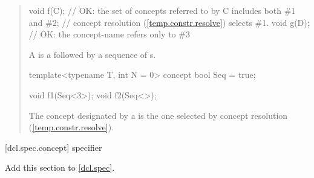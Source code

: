 \begin{quote}
\begin{codeblock}
void f(C); // OK: the set of concepts referred to by C includes both \#1 and \#2;
           // concept resolution (\ref{temp.constr.resolve}) selects \#1.
void g(D); // OK: the concept-name  refers only to \#3
\end{codeblock}
\exitexample

\pnum
A  is a  followed 
by a sequence of s.
%
\enterexample
\begin{codeblock}
template<typename T, int N = 0> concept bool Seq = true;

void f1(Seq<3>);
void f2(Seq<>);
\end{codeblock}
\exitexample

\pnum
The concept designated by a 
is the one selected by concept resolution (\ref{temp.constr.resolve}).

\end{quote}

[dcl.spec.concept]{ specifier}

Add this section to \ref{dcl.spec}.


